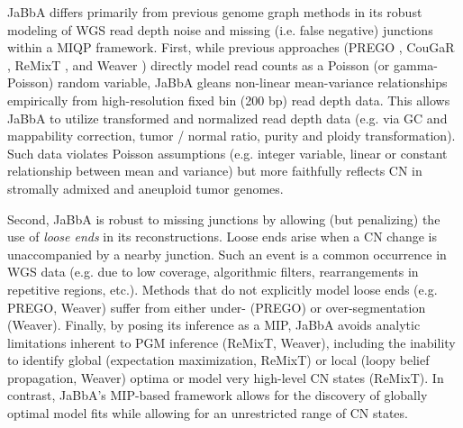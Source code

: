 \documentclass[phd,tocprelim]{cornell}
\begin{document}
JaBbA differs primarily from previous genome graph methods in its robust modeling of WGS read depth noise and missing (i.e. false negative) junctions within a MIQP framework. First, while previous approaches (PREGO \cite{Oesper2012-vw}, CouGaR \cite{Medvedev:2010bm}, ReMixT \cite{McPherson2017-ry}, and Weaver \cite{Li2016-qa}) directly model read counts as a Poisson (or gamma-Poisson) random variable, JaBbA gleans non-linear mean-variance relationships empirically from high-resolution fixed bin (200 bp) read depth data.  This allows JaBbA to utilize transformed and normalized read depth data (e.g. via GC and mappability correction, tumor / normal ratio, purity and ploidy transformation).  Such data violates Poisson assumptions (e.g. integer variable, linear or constant relationship between mean and variance) but more faithfully reflects CN in stromally admixed and aneuploid tumor genomes.

Second, JaBbA is robust to missing junctions by allowing (but penalizing) the use of \textit{loose ends} in its reconstructions.  Loose ends arise when a CN change is unaccompanied by a nearby junction. Such an event is a common occurrence in WGS data (e.g. due to low coverage, algorithmic filters, rearrangements in repetitive regions, etc.). Methods that do not explicitly model loose ends (e.g. PREGO, Weaver) suffer from either under- (PREGO) or over-segmentation (Weaver). Finally, by posing its inference as a MIP, JaBbA avoids analytic limitations inherent to PGM inference (ReMixT, Weaver), including the inability to identify global (expectation maximization, ReMixT) or local (loopy belief propagation, Weaver) optima or model very high-level CN states (ReMixT).  In contrast, JaBbA's MIP-based framework allows for the discovery of globally optimal model fits while allowing for an unrestricted range of CN states.
\end{document}
